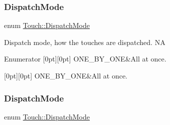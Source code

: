 \subsubsection{\texorpdfstring{Dispatch\+Mode}{DispatchMode}\hspace{0.1cm}{\footnotesize\ttfamily [1/2]}}
{\footnotesize\ttfamily enum \hyperlink{classTouch_a3970fe1342ce78786781e8383164983d}{Touch\+::\+Dispatch\+Mode}\hspace{0.3cm}{\ttfamily [strong]}}

Dispatch mode, how the touches are dispatched.  NA \begin{DoxyEnumFields}{Enumerator}
[0pt][0pt]{}\mbox{\label{classTouch_a3970fe1342ce78786781e8383164983daa5bba40bd7937ab70cc5eea0b54eed88}} 
O\+N\+E\+\_\+\+B\+Y\+\_\+\+O\+NE&All at once. \\
\hline

[0pt][0pt]{}\mbox{\label{classTouch_a3970fe1342ce78786781e8383164983daa5bba40bd7937ab70cc5eea0b54eed88}} 
O\+N\+E\+\_\+\+B\+Y\+\_\+\+O\+NE&All at once. \\
\hline

\end{DoxyEnumFields}
\mbox{\label{classTouch_a3970fe1342ce78786781e8383164983d}} 
\subsubsection{\texorpdfstring{Dispatch\+Mode}{DispatchMode}\hspace{0.1cm}{\footnotesize\ttfamily [2/2]}}
{\footnotesize\ttfamily enum \hyperlink{classTouch_a3970fe1342ce78786781e8383164983d}{Touch\+::\+Dispatch\+Mode}\hspace{0.3cm}{\ttfamily [strong]}}

